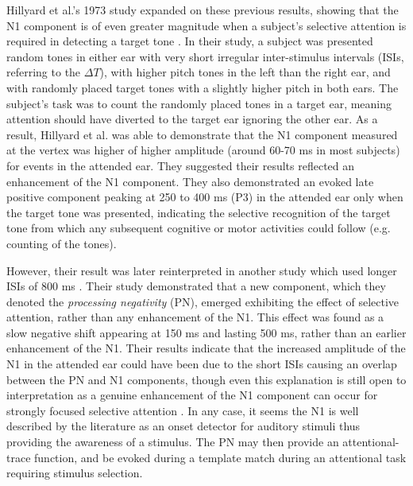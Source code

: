 Hillyard et al.'s 1973 study expanded on these previous results, showing that the N1 component is of even greater magnitude when a subject's selective attention is required in detecting a target tone \cite{Hillyard1973}.   In their study, a subject was presented random tones in either ear with very short irregular inter-stimulus intervals (ISIs, referring to the $\Delta T$), with higher pitch tones in the left than the right ear, and with randomly placed target tones with a slightly higher pitch in both ears.  The subject's task was to count the randomly placed tones in a target ear, meaning attention should have diverted to the target ear ignoring the other ear.  As a result, Hillyard et al. was able to demonstrate that the N1 component measured at the vertex was higher of higher amplitude (around 60-70 ms in most subjects) for events in the attended ear.  They suggested their results reflected an enhancement of the N1 component.  They also demonstrated an evoked late positive component peaking at 250 to 400 ms (P3) in the attended ear only when the target tone was presented, indicating the selective recognition of the target tone from which any subsequent cognitive or motor activities could follow (e.g. counting of the tones). 

However, their result was later reinterpreted in another study which used longer ISIs of 800 ms \cite{Naatanen1978}.  Their study demonstrated that a new component, which they denoted the \textit{processing negativity} (PN), emerged exhibiting the effect of selective attention, rather than any enhancement of the N1.  This effect was found as a slow negative shift appearing at 150 ms and lasting 500 ms, rather than an earlier enhancement of the N1.  Their results indicate that the increased amplitude of the N1 in the attended ear could have been due to the short ISIs causing an overlap between the PN and N1 components, though even this explanation is still open to interpretation as a genuine enhancement of the N1 component can occur for strongly focused selective attention \cite{Naatanen1978,Hillyard1983,Naatanen2011}.  In any case, it seems the N1 is well described by the literature as an onset detector for auditory stimuli thus providing the awareness of a stimulus.  The PN may then provide an attentional-trace function, and be evoked during a template match during an attentional task requiring stimulus selection.  

